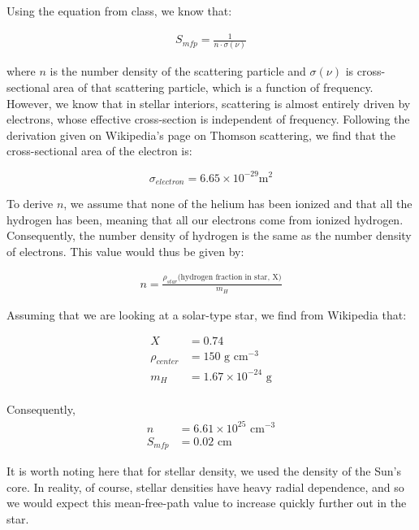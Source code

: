 \documentclass[12pt]{article}
\newenvironment{answer}[2][Answer]{\begin{trivlist}
\item[\hskip \labelsep {\bfseries #1}\hskip \labelsep {\bfseries #2.}]}{\end{trivlist}}
\begin{document}
\begin{answer}{2}
Using the equation from class, we know that:

\begin{align*}
  S_{mfp} = \frac{1}{n \cdot \sigma(\nu)}
\end{align*}

where $n$ is the number density of the scattering particle and $\sigma(\nu)$ is cross-sectional area of that scattering particle, which is a function of frequency. However, we know that in stellar interiors, scattering is almost entirely driven by electrons, whose effective cross-section is independent of frequency. Following the derivation given on Wikipedia's page on Thomson scattering, we find that the cross-sectional area of the electron is:

$$ \sigma_{electron} = 6.65 \times 10^{-29} \text{m$^2$} $$

To derive $n$, we assume that none of the helium has been ionized and that all the hydrogen has been, meaning that all our electrons come from ionized hydrogen. Consequently, the number density of hydrogen is the same as the number density of electrons. This value would thus be given by:

\begin{align*}
  n = \frac{\rho_{star} \text{(hydrogen fraction in star, X)}}{m_H}
\end{align*}


Assuming that we are looking at a solar-type star, we find from Wikipedia that:

\begin{align*}
  X &= 0.74 \\
  \rho_{center} &= 150 \text{ g cm$^{-3}$} \\
  m_H &= 1.67 \times 10^{-24} \text{ g} \\
\end{align*}


Consequently,
\begin{align*}
  n &= 6.61 \times 10^{25} \text{ cm$^{-3}$} \\
  S_{mfp} &= 0.02 \text{ cm}
\end{align*}


It is worth noting here that for stellar density, we used the density of the Sun's core. In reality, of course, stellar densities have heavy radial dependence, and so we would expect this mean-free-path value to increase quickly further out in the star.

\end{answer}
\end{document}
